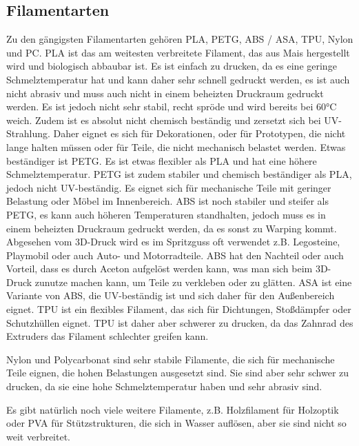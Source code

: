 \documentclass[10pt]{article}
\begin{document}
    \newpage
    \subsection{Filamentarten}
    Zu den gängigsten Filamentarten gehören PLA, PETG, ABS / ASA, TPU, Nylon und PC.
    PLA ist das am weitesten verbreitete Filament, das aus Mais hergestellt wird und biologisch abbaubar ist.
    Es ist einfach zu drucken, da es eine geringe Schmelztemperatur hat und kann daher sehr schnell gedruckt werden, es ist auch nicht abrasiv und muss auch nicht in einem beheizten Druckraum gedruckt werden.
    Es ist jedoch nicht sehr stabil, recht spröde und wird bereits bei 60°C weich.
    Zudem ist es absolut nicht chemisch beständig und zersetzt sich bei UV-Strahlung.
    Daher eignet es sich für Dekorationen, oder für Prototypen, die nicht lange halten müssen oder für Teile, die nicht mechanisch belastet werden.
    Etwas beständiger ist PETG. Es ist etwas flexibler als PLA und hat eine höhere Schmelztemperatur.
    PETG ist zudem stabiler und chemisch beständiger als PLA, jedoch nicht UV-beständig.
    Es eignet sich für mechanische Teile mit geringer Belastung oder Möbel im Innenbereich.
    ABS ist noch stabiler und steifer als PETG, es kann auch höheren Temperaturen standhalten, jedoch muss es in einem beheizten Druckraum gedruckt werden, da es sonst zu Warping kommt.
    Abgesehen vom 3D-Druck wird es im Spritzguss oft verwendet z.B. Legosteine, Playmobil oder auch Auto- und Motorradteile.
    ABS hat den Nachteil oder auch Vorteil, dass es durch Aceton aufgelöst werden kann, was man sich beim 3D-Druck zunutze machen kann, um Teile zu verkleben oder zu glätten.
    ASA ist eine Variante von ABS, die UV-beständig ist und sich daher für den Außenbereich eignet.
    TPU ist ein flexibles Filament, das sich für Dichtungen, Stoßdämpfer oder Schutzhüllen eignet.
    TPU ist daher aber schwerer zu drucken, da das Zahnrad des Extruders das Filament schlechter greifen kann.

    Nylon und Polycarbonat sind sehr stabile Filamente, die sich für mechanische Teile eignen, die hohen Belastungen ausgesetzt sind.
    Sie sind aber sehr schwer zu drucken, da sie eine hohe Schmelztemperatur haben und sehr abrasiv sind.

    Es gibt natürlich noch viele weitere Filamente, z.B. Holzfilament für Holzoptik oder PVA für Stützstrukturen, die sich in Wasser auflösen, aber sie sind nicht so weit verbreitet. \\
\end{document}
